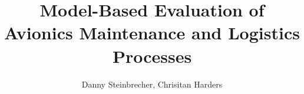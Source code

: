 \title{Model-Based Evaluation of Avionics Maintenance and Logistics Processes}

\author{Danny Steinbrecher, Chrisitan Harders}

\maketitle
